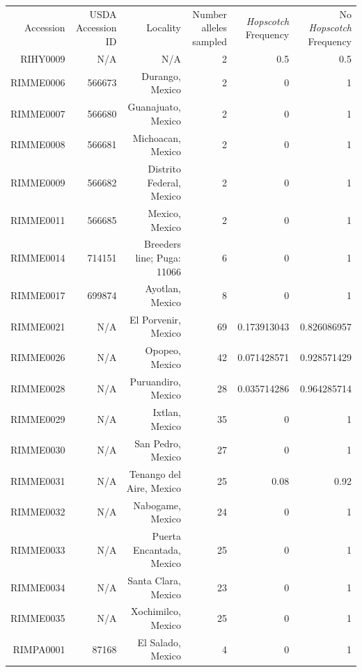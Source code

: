 \documentclass[11pt]{article}
\begin{document}
\begin{linenumbers}
\begin{flushleft}
\begin{table}[htbp]
  \centering
    \begin{tabular}{rrrrrr}
    Accession & USDA Accession ID & Locality & Number alleles sampled & \emph{Hopscotch} Frequency & No \emph{Hopscotch} Frequency \\
    RIHY0009 & N/A   & N/A   & 2     & 0.5   & 0.5 \\
    RIMME0006 & 566673 & Durango, Mexico & 2     & 0     & 1 \\
    RIMME0007 & 566680 & Guanajuato, Mexico & 2     & 0     & 1 \\
    RIMME0008 & 566681 & Michoacan, Mexico & 2     & 0     & 1 \\
    RIMME0009 & 566682 & Distrito Federal, Mexico & 2     & 0     & 1 \\
    RIMME0011 & 566685 & Mexico, Mexico & 2     & 0     & 1 \\
    RIMME0014 & 714151 & Breeders line; Puga: 11066 & 6     & 0     & 1 \\
    RIMME0017 & 699874 & Ayotlan, Mexico & 8     & 0     & 1 \\
    RIMME0021 & N/A   & El Porvenir, Mexico & 69    & 0.173913043 & 0.826086957 \\
    RIMME0026 & N/A   & Opopeo, Mexico & 42    & 0.071428571 & 0.928571429 \\
    RIMME0028 & N/A   & Puruandiro, Mexico & 28    & 0.035714286 & 0.964285714 \\
    RIMME0029 & N/A   & Ixtlan, Mexico & 35    & 0     & 1 \\
    RIMME0030 & N/A   & San Pedro, Mexico & 27    & 0     & 1 \\
    RIMME0031 & N/A   & Tenango del Aire, Mexico & 25    & 0.08  & 0.92 \\
    RIMME0032 & N/A   & Nabogame, Mexico & 24    & 0     & 1 \\
    RIMME0033 & N/A   & Puerta Encantada, Mexico & 25    & 0     & 1 \\
    RIMME0034 & N/A   & Santa Clara, Mexico & 23    & 0     & 1 \\
    RIMME0035 & N/A   & Xochimilco, Mexico & 25    & 0     & 1 \\
    RIMPA0001 & 87168 & El Salado, Mexico & 4     & 0     & 1 \\

\end{tabular}
\end{table}
\end{flushleft}
\end{linenumbers}
\end{document}
